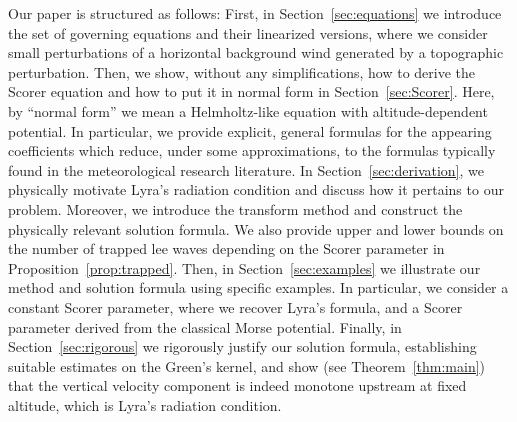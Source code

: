 \documentclass[11pt,twoside,reqno,centertags]{amsart}
\theoremstyle{definition}
\begin{document}
Our paper is structured as follows: First, in Section~\ref{sec:equations} we introduce the set of governing equations and their linearized versions, where we consider small perturbations of a horizontal background wind generated by a topographic perturbation. Then, we show, without any simplifications, how to derive the Scorer equation and how to put it in normal form in Section~\ref{sec:Scorer}. Here, by \enquote{normal form} we mean a Helmholtz-like equation with altitude-dependent potential. In particular, we provide explicit, general formulas for the appearing coefficients which reduce, under some approximations, to the formulas typically found in the meteorological research literature. In Section~\ref{sec:derivation}, we 
physically motivate Lyra's radiation condition and discuss how it pertains to our problem. Moreover, we introduce the transform method and construct the physically relevant solution formula. We also provide upper and lower bounds on the number of trapped lee waves depending on the Scorer parameter in Proposition~\ref{prop:trapped}. Then, in Section~\ref{sec:examples} we illustrate our method and solution formula using specific examples. In particular, we consider a constant Scorer parameter, where we recover Lyra's formula, and a Scorer parameter derived from the classical Morse potential. Finally, in Section~\ref{sec:rigorous} we rigorously justify our solution formula, establishing suitable estimates on the Green's kernel, and show (see Theorem~\ref{thm:main}) 
that the vertical velocity component is indeed monotone upstream at fixed altitude, which is Lyra's radiation condition.
\end{document}
